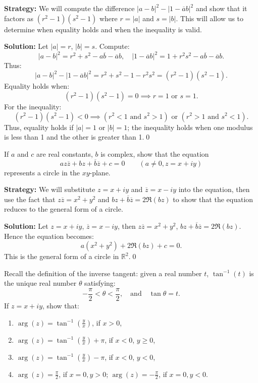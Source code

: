 \noindent\textbf{Strategy:} We will compute the difference $|a - b|^2 - |1 - \overline{a}b|^2$ and show that it factors as $(r^2 - 1)(s^2 - 1)$ where $r = |a|$ and $s = |b|$. This will allow us to determine when equality holds and when the inequality is valid.

\bigskip\noindent\textbf{Solution:}
Let \( |a| = r \), \( |b| = s \). Compute:
\[
|a - b|^2 = r^2 + s^2 - a\overline{b} - \overline{a}b, \quad |1 - \overline{a}b|^2 = 1 + r^2 s^2 - a\overline{b} - \overline{a}b.
\]
Thus:
\[
|a - b|^2 - |1 - \overline{a}b|^2 = r^2 + s^2 - 1 - r^2 s^2 = (r^2 - 1)(s^2 - 1).
\]
Equality holds when:
\[
(r^2 - 1)(s^2 - 1) = 0 \implies r = 1 \text{ or } s = 1.
\]
For the inequality:
\[
(r^2 - 1)(s^2 - 1) < 0 \implies (r^2 < 1 \text{ and } s^2 > 1) \text{ or } (r^2 > 1 \text{ and } s^2 < 1).
\]
Thus, equality holds if \( |a| = 1 \) or \( |b| = 1 \); the inequality holds when one modulus is less than 1 and the other is greater than 1.\qed


\begin{problembox}
If \( a \) and \( c \) are real constants, \( b \) is complex, show that the equation
\[
az\overline{z} + bz + \overline{b} \overline{z} + c = 0 \qquad (a \ne 0, z = x + iy)
\]
represents a circle in the \( xy \)-plane.
\end{problembox}

\noindent\textbf{Strategy:} We will substitute $z = x + iy$ and $\overline{z} = x - iy$ into the equation, then use the fact that $z\overline{z} = x^2 + y^2$ and $bz + \overline{b}\overline{z} = 2\Re(bz)$ to show that the equation reduces to the general form of a circle.

\bigskip\noindent\textbf{Solution:}
Let \( z = x + iy \), \( \overline{z} = x - iy \), then \( z \overline{z} = x^2 + y^2 \), \( bz + \overline{b} \overline{z} = 2 \Re(b z) \). Hence the equation becomes:
\[
a(x^2 + y^2) + 2 \Re(b z) + c = 0.
\]
This is the general form of a circle in \( \mathbb{R}^2 \).\qed


\begin{problembox}
Recall the definition of the inverse tangent: given a real number \( t \), \( \tan^{-1}(t) \) is the unique real number \( \theta \) satisfying:
\[
-\frac{\pi}{2} < \theta < \frac{\pi}{2}, \quad \text{and} \quad \tan \theta = t.
\]
If \( z = x + iy \), show that:
\begin{enumerate}[label=\alph*)]
\item \( \arg(z) = \tan^{-1}\left( \frac{y}{x} \right) \), if \( x > 0 \),
\item \( \arg(z) = \tan^{-1}\left( \frac{y}{x} \right) + \pi \), if \( x < 0 \), \( y \geq 0 \),
\item \( \arg(z) = \tan^{-1}\left( \frac{y}{x} \right) - \pi \), if \( x < 0 \), \( y < 0 \),
\item \( \arg(z) = \frac{\pi}{2} \), if \( x = 0, y > 0 \); \quad \( \arg(z) = -\frac{\pi}{2} \), if \( x = 0, y < 0 \).
\end{enumerate}
\end{problembox}

